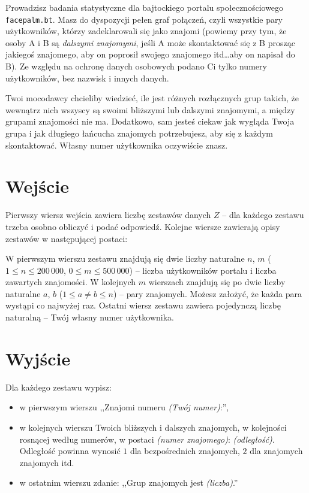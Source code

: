 \documentclass{spiral-kurs}
\begin{document}
\makeheader
%

Prowadzisz badania statystyczne dla bajtockiego portalu społecznościowego \texttt{facepalm.bt}. Masz do dyspozycji pełen graf połączeń, czyli wszystkie pary użytkowników, którzy zadeklarowali się jako znajomi (powiemy przy tym, że osoby A i B są \textit{dalszymi znajomymi}, jeśli A może skontaktować się z B prosząc jakiegoś znajomego, aby on poprosił swojego znajomego itd\ldots aby on napisał do B). Ze względu na ochronę danych osobowych podano Ci tylko numery użytkowników, bez nazwisk i innych danych.

Twoi mocodawcy chcieliby wiedzieć, ile jest różnych rozłącznych grup takich, że wewnątrz nich wszyscy są swoimi bliższymi lub dalszymi znajomymi, a między grupami znajomości nie ma. Dodatkowo, sam jesteś ciekaw jak wygląda Twoja grupa i jak długiego łańcucha znajomych potrzebujesz, aby się z każdym skontaktować. Własny numer użytkownika oczywiście znasz.


    \section{Wejście}

Pierwszy wiersz wejścia zawiera liczbę zestawów danych $Z$ -- dla każdego zestawu trzeba osobno obliczyć i podać odpowiedź. Kolejne wiersze zawierają opisy zestawów w następującej postaci:

W pierwszym wierszu zestawu znajdują się dwie liczby naturalne $n$, $m$ ($1 \leq n \leq 200\,000$, $0 \leq m \leq 500\,000$) -- liczba użytkowników portalu i liczba zawartych znajomości. W kolejnych $m$ wierszach znajdują się po dwie liczby naturalne $a$, $b$ ($1 \leq a \neq b \leq n$) -- pary znajomych. Możesz założyć, że każda para wystąpi co najwyżej raz. Ostatni wiersz zestawu zawiera pojedynczą liczbę naturalną -- Twój własny numer użytkownika.

    \section{Wyjście}

Dla każdego zestawu wypisz:
\begin{itemize}
\item w pierwszym wierszu ,,Znajomi numeru \textit{(Twój numer)}:'',
\item w kolejnych wierszu Twoich bliższych i dalszych znajomych, w kolejności rosnącej według numerów, w postaci \textit{(numer znajomego)}: \textit{(odległość)}. Odległość powinna wynosić $1$ dla bezpośrednich znajomych, $2$ dla znajomych znajomych itd.
\item w ostatnim wierszu zdanie: ,,Grup znajomych jest \textit{(liczba)}.''
\end{itemize}


  
\end{document}
